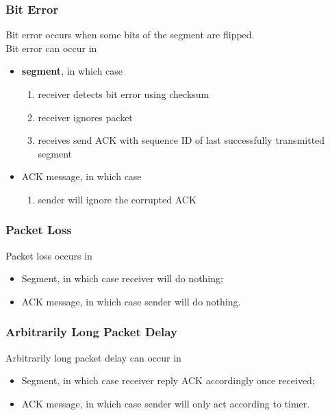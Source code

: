 \documentclass[12pt]{article}
\theoremstyle{definition}
\begin{document}
\subsubsection{Bit Error}
Bit error occurs when some bits of the segment are flipped.\\
Bit error can occur in
\begin{itemize}
  \item \textbf{segment}, in which case
  \begin{enumerate}
    \item receiver detects bit error using checksum
    \item receiver ignores packet
    \item receives send ACK with sequence ID of last successfully transmitted segment
  \end{enumerate}
  \item ACK message, in which case
  \begin{enumerate}
    \item sender will ignore the corrupted ACK
  \end{enumerate}
\end{itemize}
\subsubsection{Packet Loss}
Packet loss occurs in
\begin{itemize}
  \item Segment, in which case receiver will do nothing;
  \item ACK message, in which case sender will do nothing.
\end{itemize}
\subsubsection{Arbitrarily Long Packet Delay}
Arbitrarily long packet delay can occur in
\begin{itemize}
  \item Segment, in which case receiver reply ACK accordingly once received;
  \item ACK message, in which case sender will only act according to timer.
\end{itemize}
\end{document}
